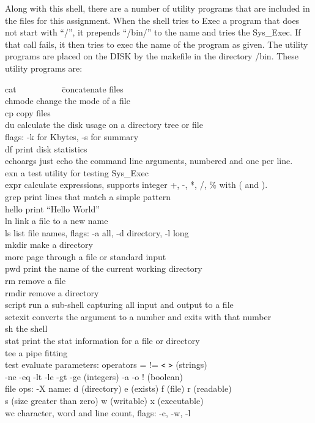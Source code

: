 \documentclass[11pt]{article}
\begin{document}
Along with this shell, there are a number of utility programs that
are included in the files for this assignment.  When the shell
tries to Exec a program that does not start with ``/'', it
prepends ``/bin/'' to the name and tries the Sys\_Exec.  If that
call fails, it then tries to exec the name of the program as given.
The utility programs are placed
on the DISK by the makefile in the directory /bin.   These utility
programs are:
\begin{tabbing}
  cat \ \ \ \ \ \ \ \ \ \ \= concatenate files \\
  chmode \> change the mode of a file \\
  cp \> copy files \\
  du \> calculate the disk usage on a directory tree or file \\
     \> flags: -k for Kbytes, -s for summary \\
  df \> print disk statistics \\
  echoargs \> just echo the command line arguments, numbered and one per line.\\
  exn \> a test utility for testing Sys\_Exec \\
  expr \> calculate expressions, supports integer +, -, *, /, \% with ( and ).\\
  grep \> print lines that match a simple pattern \\
  hello \> print ``Hello World'' \\
  ln \> link a file to a new name \\
  ls \> list file names, flags: -a all, -d directory, -l long \\
  mkdir \> make a directory \\
  more \> page through a file or standard input \\
  pwd \> print the name of the current working directory \\
  rm \> remove a file \\
  rmdir \> remove a directory \\
  script \> run a sub-shell capturing all input and output to a file \\
  setexit \> converts the argument to a number and exits with that number \\
  sh \> the shell \\
  stat \> print the stat information for a file or directory \\
  tee \> a pipe fitting \\
  test \> evaluate parameters: operators = != \verb+<+ \verb+>+ (strings) \\
  \> -ne -eq -lt -le -gt -ge (integers) -a -o ! (boolean) \\
  \> file ops: -X name:  d (directory) e (exists) f (file) r (readable) \\
  \> s (size greater than zero) w (writable) x (executable) \\
  wc \> character, word and line count, flags: -c, -w, -l
\end{tabbing}
\end{document}
